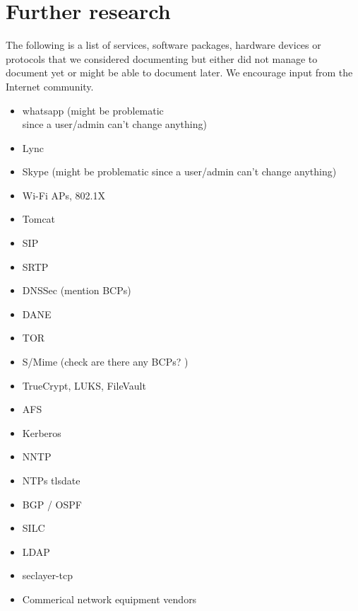 \newpage
\section{Further research}
\label{section:furtherresearch}
The following is a list of services, software packages, hardware devices or protocols that we considered documenting but either did not manage to document yet or might be able to document later. We encourage input from the Internet community. 

\vline{}

\begin{minipage}[b]{0.5\linewidth}
\begin{itemize}
\item whatsapp (might be problematic\\ since a user/admin can't change anything)
\item Lync
\item Skype (might be problematic since a user/admin can't change anything)
\item Wi-Fi APs, 802.1X
\item Tomcat
\item SIP 
\item SRTP 
\item DNSSec (mention BCPs) 
\item DANE
\item TOR 
\item S/Mime (check are there any BCPs? )
\item TrueCrypt, LUKS, FileVault
\item AFS 
\item Kerberos 
\item NNTP 
\item NTPs tlsdate 
\item BGP / OSPF 
\item SILC
\item LDAP
\item seclayer-tcp
\item Commerical network equipment vendors
\end{itemize}
\end{minipage}

